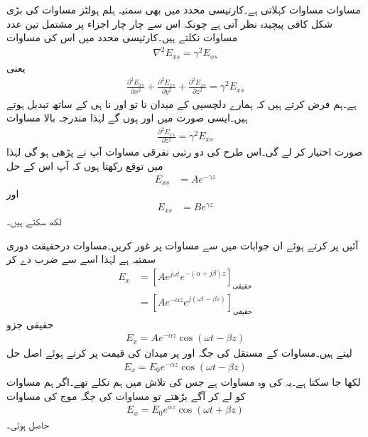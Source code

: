  مساوات    مساوات کہلاتی ہے۔کارتیسی محدد میں بھی سمتیہ ہلم ہولٹز مساوات کی بڑی شکل  کافی پیچیدہ نظر آتی ہے چونکہ اس سے چار چار اجزاء پر مشتمل تین عدد مساوات نکلتے ہیں۔کارتیسی محدد میں اس  کی  مساوات 
\begin{align}
\nabla^2 E_{xs}=\gamma^2 E_{xs} 
\end{align}
یعنی
\begin{align}
\frac{\partial^2  E_{xs}}{\partial x^2}+\frac{\partial^2  E_{xs}}{\partial y^2}+\frac{\partial^2  E_{xs}}{\partial z^2} =\gamma^2  E_{xs} 
\end{align}
ہے۔ہم فرض کرتے ہیں کہ ہمارے دلچسپی کے میدان نا تو  اور نا ہی  کے ساتھ تبدیل ہوتے ہیں۔ایسی صورت
 میں  اور  ہوں گے لہٰذا  مندرجہ بالا مساوات
\begin{align}
\frac{\partial^2  E_{xs}}{\partial z^2} =\gamma^2 E_{xs} 
\end{align}
صورت اختیار کر لے گی۔اس طرح کی دو رتبی تفرقی مساوات آپ نے پڑھی ہو گی لہٰذا میں توقع رکھتا ہوں کہ آپ اس کے حل
\begin{align}\label{مساوات_موج_مثبت_زیڈ_جانب}
E_{xs}&=A e^{-\gamma z}
\end{align}
اور
\begin{align}\label{مساوات_موج_منفی_زیڈ_جانب}
E_{xs}&=Be^{\gamma z}
\end{align}
لکھ سکتے ہیں۔

آئیں  پر کرتے ہوئے ان جوابات میں سے مساوات  پر غور کریں۔مساوات  درحقیقت دوری سمتیہ ہے لہٰذا اسے   سے ضرب دے کر
\begin{align*}
E_x&=\left[A e^{j \omega t} e^{-(\alpha+j \beta) z} \right]_{\text{حقیقی}}\\
&=\left[A e^{-\alpha z} e^{j(\omega t -\beta z)} \right]_{\text{حقیقی}}
\end{align*}
حقیقی  جزو
\begin{align*}
E_x=A e^{-\alpha z} \cos (\omega t -\beta z)
\end{align*}
لیتے ہیں۔مساوات کے مستقل  کی جگہ  اور  پر میدان کی قیمت  پر کرتے ہوئے اصل حل
\begin{align}\label{مساوات_موج_کوسائن_مثبت_موج}
E_x=E_0 e^{-\alpha z} \cos (\omega t -\beta z)
\end{align}
لکھا جا سکتا ہے۔یہ  کی وہ مساوات  ہے جس کی تلاش میں ہم نکلے تھے۔اگر ہم مساوات  کو لے کر آگے بڑھتے تو مساوات  کی جگہ موج کی مساوات
\begin{align}\label{مساوات_موج_کوسائن_منفی_موج}
E_x=E_0 e^{\alpha z} \cos (\omega t +\beta z)
\end{align}
حاصل ہوتی۔

